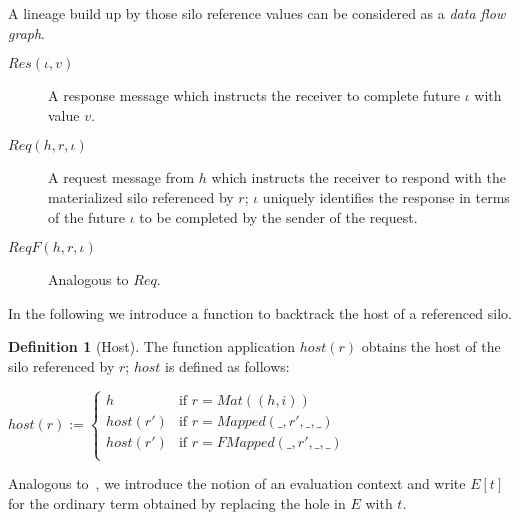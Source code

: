 \documentclass{article}
\theoremstyle{definition}
\newtheorem{defn}{Definition}[section]
\begin{document}
A lineage build up by those silo reference values can be considered as a {\emph{data flow graph}}\cite{???}. %

\begin{description}
\item[$Res(\iota, v)$] A response message which instructs the receiver to complete future $\iota$ with value $v$.

\item[$Req(h, r, \iota)$] A request message from $h$ which instructs the receiver to respond with the materialized silo referenced by $r$; $\iota$ uniquely identifies the response in terms of the future $\iota$ to be completed by the sender of the request.

\item[$ReqF(h, r, \iota)$] Analogous to $Req$.
\end{description}

In the following we introduce a function to backtrack the host of a referenced silo.

\begin{defn}[Host]
  The function application $host(r)$ obtains the host of the silo referenced by $r$; $host$ is defined as follows:
  
  $host(r) := \begin{cases}
    h        & \text{if } r = Mat((h, i)) \\
    host(r') & \text{if } r = Mapped(\_, r', \_, \_) \\
    host(r') & \text{if } r = FMapped(\_, r', \_, \_) \\
    \end{cases}$
\end{defn}

Analogous to~\cite{TAPL}, we introduce the notion of an evaluation context and write $E[t]$ for the ordinary term obtained by replacing the hole in $E$ with $t$.
\end{document}
